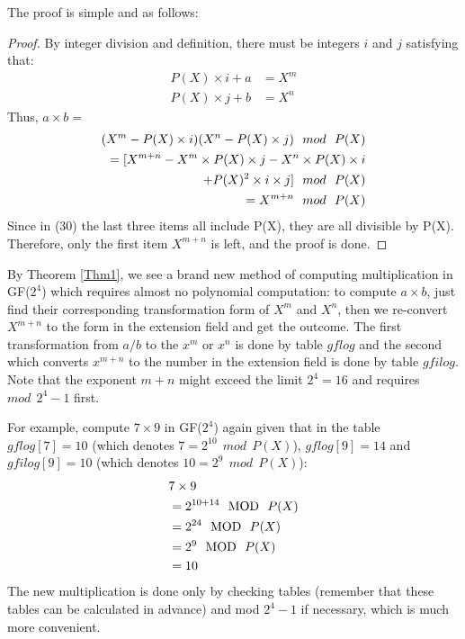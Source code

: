 \documentclass[journal]{IEEEtran}
\begin{document}
The proof is simple and as follows:

\begin{proof}
By integer division and definition, there must be integers $i$ and $j$ satisfying that: 
    \begin{align}
        P(X) \times i + a &= X^m\\
        P(X) \times j + b &= X^n
    \end{align}
Thus, \(a \times b =\)
    \begin{align}
        (X^m - P(X) \times i)(X^n - P(X) \times j) \ \ mod \ \ P(X) \\
        = [X^{m+n} - X^m \times P(X) \times j - X^n \times P(X) \times i \notag \\
        + P(X)^2 \times i \times j] \ \ mod \ \ P(X) \\
        = X^{m+n} \ \ mod \ \ P(X)
    \end{align}
Since in (30) the last three items all include P(X), they are all divisible by P(X). Therefore, only the first item $X^{m+n}$ is left, and the proof is done.
\end{proof}

By Theorem \ref{Thm1}, we see a brand new method of computing multiplication in GF($2^4$) which requires almost no polynomial computation: to compute $a \times b$, just find their corresponding transformation form of $X^m$ and $X^n$, then we re-convert $X^{m+n}$ to the form in the extension field and get the outcome. The first transformation from $a/b$ to the $x^m$ or $x^n$ is done by table $gflog$ and the second which converts $x^{m+n}$ to the number in the extension field is done by table $gfilog$. Note that the exponent $m+n$ might exceed the limit $2^4 = 16$ and requires $mod \ \ 2^4 - 1$ first.

For example, compute \(7 \times 9\) in GF($2^4$) again given that in the table $gflog[7] = 10$ (which denotes $7 = 2^{10} \ \ mod \ \ P(X)$), $gflog[9]=14$ and $gfilog[9] = 10$ (which denotes $10 = 2^9 \ \ mod \ \ P(X)$):
    \begin{align}
        &7 \times 9\notag\\
        &= 2^{10 + 14} \ \ \text{MOD} \ \ P(X)\notag\\
        &= 2^{24}\ \ \text{MOD} \ \ P(X)\notag\\
        &= 2^{9}\ \ \text{MOD} \ \ P(X)\notag\\
        &= 10\notag
    \end{align}
The new multiplication is done only by checking tables (remember that these tables can be calculated in advance) and mod $2^4 -1$ if necessary, which is much more convenient.
\end{document}
